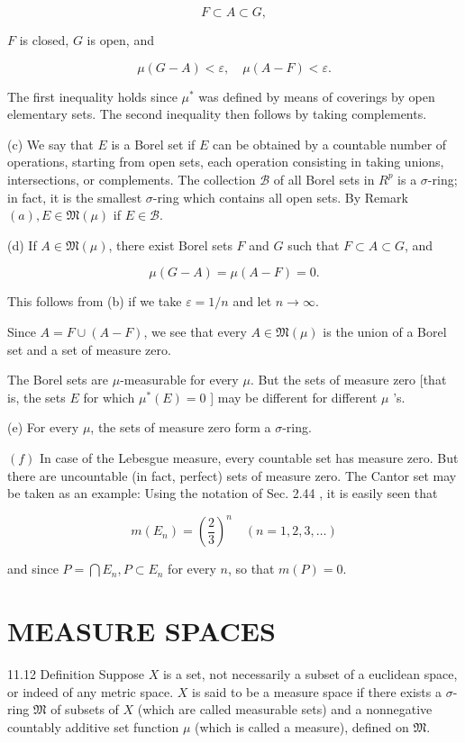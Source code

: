 \documentclass[10pt]{article}
\begin{document}
$$
F \subset A \subset G,
$$

$F$ is closed, $G$ is open, and

$$
\mu(G-A)<\varepsilon, \quad \mu(A-F)<\varepsilon .
$$

The first inequality holds since $\mu^{*}$ was defined by means of coverings by open elementary sets. The second inequality then follows by taking complements.

(c) We say that $E$ is a Borel set if $E$ can be obtained by a countable number of operations, starting from open sets, each operation consisting in taking unions, intersections, or complements. The collection $\mathscr{B}$ of all Borel sets in $R^{p}$ is a $\sigma$-ring; in fact, it is the smallest $\sigma$-ring which contains all open sets. By Remark $(a), E \in \mathfrak{M}(\mu)$ if $E \in \mathscr{B}$.

(d) If $A \in \mathfrak{M}(\mu)$, there exist Borel sets $F$ and $G$ such that $F \subset A \subset G$, and

$$
\mu(G-A)=\mu(A-F)=0 .
$$

This follows from (b) if we take $\varepsilon=1 / n$ and let $n \rightarrow \infty$.

Since $A=F \cup(A-F)$, we see that every $A \in \mathfrak{M}(\mu)$ is the union of a Borel set and a set of measure zero.

The Borel sets are $\mu$-measurable for every $\mu$. But the sets of measure zero [that is, the sets $E$ for which $\mu^{*}(E)=0$ ] may be different for different $\mu$ 's.

(e) For every $\mu$, the sets of measure zero form a $\sigma$-ring.

$(f)$ In case of the Lebesgue measure, every countable set has measure zero. But there are uncountable (in fact, perfect) sets of measure zero. The Cantor set may be taken as an example: Using the notation of Sec. 2.44 , it is easily seen that

$$
m\left(E_{n}\right)=\left(\frac{2}{3}\right)^{n} \quad(n=1,2,3, \ldots)
$$

and since $P=\bigcap E_{n}, P \subset E_{n}$ for every $n$, so that $m(P)=0$.

\section{MEASURE SPACES}
11.12 Definition Suppose $X$ is a set, not necessarily a subset of a euclidean space, or indeed of any metric space. $X$ is said to be a measure space if there exists a $\sigma$-ring $\mathfrak{M}$ of subsets of $X$ (which are called measurable sets) and a nonnegative countably additive set function $\mu$ (which is called a measure), defined on $\mathfrak{M}$.
\end{document}
